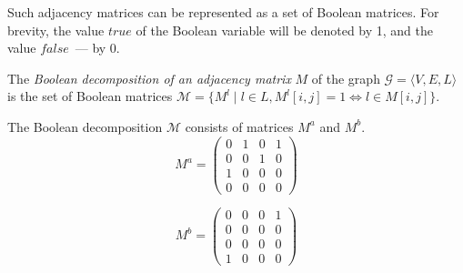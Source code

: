 Such adjacency matrices can be represented as a set of Boolean matrices. For brevity, the value $true$ of the Boolean variable will be denoted by 1, and the value $false$~--- by 0.

\begin{definition}
	The \textit{Boolean decomposition of an adjacency matrix} $M$ of the graph $\mathcal{G}=\langle V, E, L \rangle$ is the set of Boolean matrices $\mathcal{M} = \{M^l \mid l \in L, M^l[i, j] = 1 \iff l \in M[i, j]\}$.
\end{definition}

\begin{example}
	The Boolean decomposition $\mathcal{M}$ consists of matrices $M^a$ and $M^b$.
	$$
	M^a = \begin{pmatrix}
	0 & 1 & 0 & 1 \\
	0 & 0 & 1 & 0 \\
	1 & 0 & 0 & 0 \\
	0 & 0 & 0 & 0
	\end{pmatrix}
	$$
	
	$$
	M^b = \begin{pmatrix}
	0 & 0 & 0 & 1 \\
	0 & 0 & 0 & 0 \\
	0 & 0 & 0 & 0 \\
	1 & 0 & 0 & 0
	\end{pmatrix}
	$$
\end{example}


